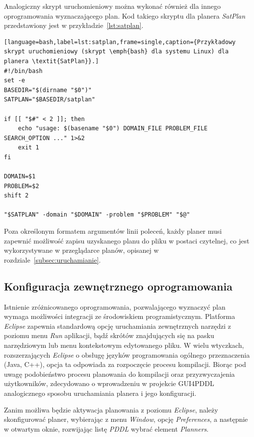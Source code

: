Analogiczny skrypt uruchomieniowy można wykonać również dla innego oprogramowania wyznaczającego plan. Kod takiego skryptu dla planera \emph{SatPlan} przedstawiony jest w przykładzie~\ref{lst:satplan}.
  
\begin{Code}
\begin{lstlisting}[language=bash,label=lst:satplan,frame=single,caption={Przykładowy skrypt uruchomieniowy (skrypt \emph{bash} dla systemu Linux) dla planera \textit{SatPlan}}.]
#!/bin/bash
set -e
BASEDIR="$(dirname "$0")"
SATPLAN="$BASEDIR/satplan"

if [[ "$#" < 2 ]]; then
    echo "usage: $(basename "$0") DOMAIN_FILE PROBLEM_FILE SEARCH_OPTION ..." 1>&2
    exit 1
fi

DOMAIN=$1
PROBLEM=$2
shift 2

"$SATPLAN" -domain "$DOMAIN" -problem "$PROBLEM" "$@"
\end{lstlisting}
\end{Code}

Poza określonym formatem argumentów linii poleceń, każdy planer musi zapewnić możliwość zapisu uzyskanego planu do pliku w postaci czytelnej, co jest wykorzystywane w przeglądarce planów, opisanej w rozdziale~\ref{subsec:uruchamianie}.

\subsection{Konfiguracja zewnętrznego oprogramowania}
\label{subsec:konfiguracja}
Istnienie zróżnicowanego oprogramowania, pozwalającego wyznaczyć plan wymaga możliwości integracji ze środowiskiem programistycznym. Platforma \emph{Eclipse} zapewnia standardową opcję uruchamiania zewnętrznych narzędzi z poziomu menu \emph{Run} aplikacji, bądź skrótów znajdujących się na pasku narzędziowym lub menu kontekstowym edytowanego pliku. W wielu wtyczkach, rozszerzających \emph{Eclipse} o obsługę języków programowania ogólnego przeznaczenia (Java, C++), opcja ta odpowiada za rozpoczęcie procesu kompilacji. Biorąc pod uwagę podobieństwo procesu planowania do kompilacji oraz przyzwyczajenia użytkowników, zdecydowano o wprowadzeniu w projekcie GUI4PDDL analogicznego sposobu uruchamiania planera i jego konfiguracji.

Zanim możliwa będzie aktywacja planowania z poziomu \emph{Eclipse}, należy skonfigurować planer, wybierając z menu \emph{Window}, opcję \emph{Preferences}, a następnie w otwartym oknie, rozwijając listę \emph{PDDL} wybrać element \emph{Planners}.

